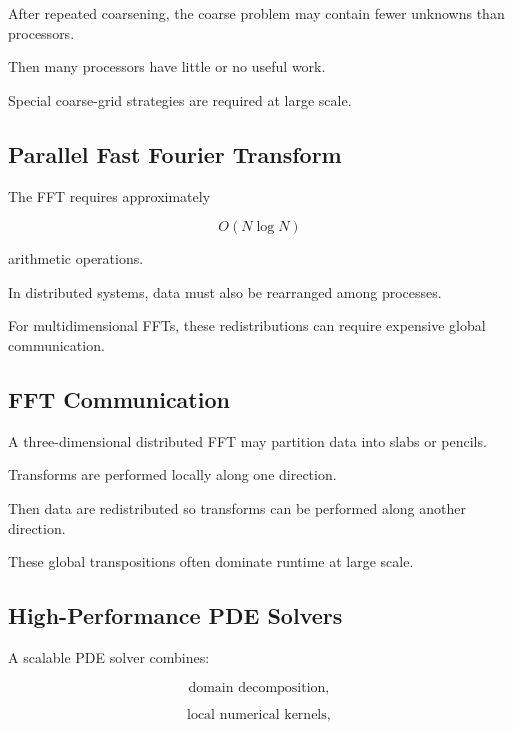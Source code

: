 After repeated coarsening, the coarse problem may contain fewer unknowns
than processors.

Then many processors have little or no useful work.

Special coarse-grid strategies are required at large scale.

\subsection{Parallel Fast Fourier Transform}
\label{subsec:parallel-fft}

The FFT requires approximately

\[
\boxed{
O(N\log N)
}
\]

arithmetic operations.

In distributed systems, data must also be rearranged among processes.

For multidimensional FFTs, these redistributions can require expensive
global communication.

\subsection{FFT Communication}
\label{subsec:fft-communication}

A three-dimensional distributed FFT may partition data into slabs or
pencils.

Transforms are performed locally along one direction.

Then data are redistributed so transforms can be performed along another
direction.

These global transpositions often dominate runtime at large scale.

\subsection{High-Performance PDE Solvers}
\label{subsec:high-performance-pde-solvers}

A scalable PDE solver combines:

\[
\boxed{
\text{domain decomposition},
}
\]

\[
\boxed{
\text{local numerical kernels},
}
\]

